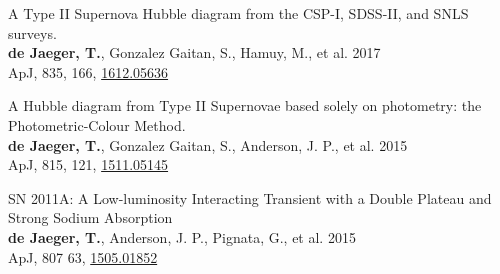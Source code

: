 \documentclass[12pt]{article}
\begin{document}
\begin{bibenum}
    \item 
A Type II Supernova Hubble diagram from the CSP-I, SDSS-II, and SNLS surveys.\\
\textbf{de Jaeger, T.}, Gonzalez Gaitan, S., Hamuy, M., et al. 2017\\
ApJ, 835, 166, \href{https://arxiv.org/abs/1612.05636}{1612.05636}
    \item 
A Hubble diagram from Type II Supernovae based solely on photometry: the Photometric-Colour Method.\\
\textbf{de Jaeger, T.}, Gonzalez Gaitan, S., Anderson, J. P., et al. 2015\\
ApJ, 815, 121, \href{http://arxiv.org/abs/1511.05145}{1511.05145}
    \item 
SN 2011A: A Low-luminosity Interacting Transient with a Double Plateau and Strong Sodium Absorption\\
\textbf{de Jaeger, T.}, Anderson, J. P., Pignata, G., et al. 2015\\
ApJ, 807 63, \href{http://arxiv.org/abs/1505.01852}{1505.01852} 

\end{bibenum}
\end{document}
